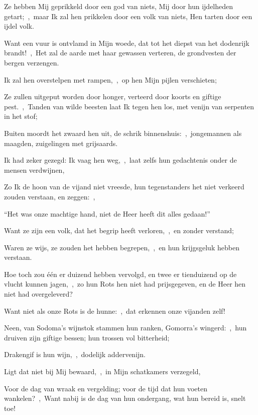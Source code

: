 \documentclass[12pt,twoside,a5paper]{article}
\begin{document}

\begin{halfparskip}
  Ze hebben Mij geprikkeld door een god van niets, Mij door hun ijdelheden getart;~\sep\ maar Ik zal hen prikkelen door een volk van niets, Hen tarten door een ijdel volk.


  Want een vuur is ontvlamd in Mijn woede, dat tot het diepst van het dodenrijk brandt!~\sep\ Het zal de aarde met haar gewassen verteren, de grondvesten der bergen verzengen.

  Ik zal hen overstelpen met rampen,~\sep\ op hen Mijn pijlen verschieten;

  Ze zullen uitgeput worden door honger, verteerd door koorts en giftige pest.~\sep\ Tanden van wilde beesten laat Ik tegen hen los, met venijn van serpenten in het stof;

  Buiten moordt het zwaard hen uit, de schrik binnenshuis:~\sep\ jongemannen als maagden, zuigelingen met grijsaards.

  Ik had zeker gezegd: Ik vaag hen weg,~\sep\ laat zelfs hun gedachtenis onder de mensen verdwijnen,

  Zo Ik de hoon van de vijand niet vreesde, hun tegenstanders het niet verkeerd zouden verstaan, en zeggen:~\sep

  ``Het was onze machtige hand, niet de Heer heeft dit alles gedaan!''

  Want ze zijn een volk, dat het begrip heeft verloren,~\sep\ en zonder verstand;

  Waren ze wijs, ze zouden het hebben begrepen,~\sep\ en hun krijgsgeluk hebben verstaan.

  Hoe toch zou één er duizend hebben vervolgd, en twee er tienduizend op de vlucht kunnen jagen,~\sep\ zo hun Rots hen niet had prijsgegeven, en de Heer hen niet had overgeleverd?

  Want niet als onze Rots is de hunne:~\sep\ dat erkennen onze vijanden zelf!

  Neen, van Sodoma's wijnstok stammen hun ranken, Gomorra's wingerd:~\sep\ hun druiven zijn giftige bessen; hun trossen vol bitterheid;

  Drakengif is hun wijn,~\sep\ dodelijk addervenijn.

  Ligt dat niet bij Mij bewaard,~\sep\ in Mijn schatkamers verzegeld,

  Voor de dag van wraak en vergelding; voor de tijd dat hun voeten wankelen?~\sep\ Want nabij is de dag van hun ondergang, wat hun bereid is, snelt toe!


\end{halfparskip}
\end{document}
